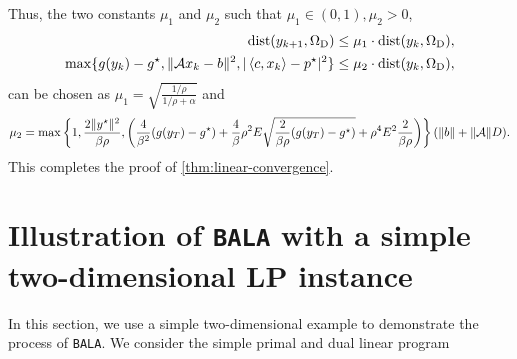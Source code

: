 \documentclass[11pt]{article}
\newcommand{\alg}{\texttt{BALA}}%
\begin{document}
Thus, the two constants $\mu_1$ and $\mu_2$ such that $\mu_1 \in (0,1), \mu_2 > 0$, 
\begin{align*}
    \mathrm{dist}(y_{k+1}, \Omega_{\mathrm{D}}) & \leq \mu_1 \cdot \mathrm{dist}(y_{k}, \Omega_{\mathrm{D}}), \\
    \max\{g(y_k) - g^\star, \|\mathcal{A} x_{k} - b \|^2, | \left \langle c, x_k \right\rangle - p^\star |^2\} &\leq \mu_2  \cdot  \mathrm{dist}(y_{k}, \Omega_{\mathrm{D}}),
\end{align*}
can be chosen as $\mu_1   = \sqrt{\frac{1/\rho}{1/\rho +\alpha}}$ and 
\begin{align*}
      \mu_2 = \max\left\{ 1,\frac{2 \|y^\star\|^2}{\beta \rho } , \left(\frac{4}{\beta^2}(g(y_T)  -  g^\star) + \frac{4}{\beta} \rho^2 E  \sqrt{\frac{2}{\beta \rho } (g(y_{T}) - g^\star)} + \rho^4 E^2  \frac{2}{\beta \rho }\right )  \right\} (\|b\| + \|\mathcal{A}\|D).
\end{align*}
This completes the proof of \cref{thm:linear-convergence}.





\section{Illustration of \alg{} with a simple two-dimensional LP instance}
\label{apx:section:illustration}
In this section, we use a simple two-dimensional example to demonstrate the process of \alg{}. We consider the simple primal and dual linear program
\end{document}
